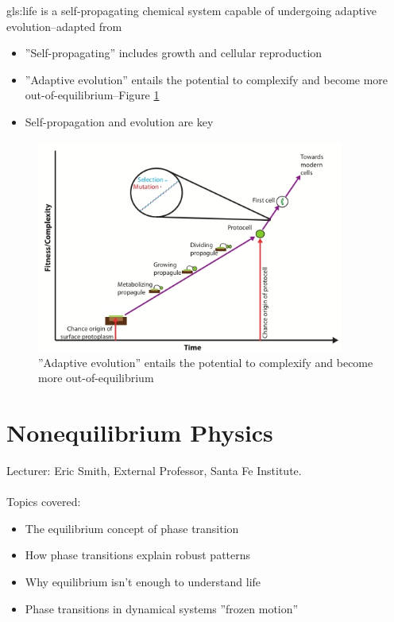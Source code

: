 \documentclass[]{article}
\begin{document}
\gls{gls:life} is a self-propagating chemical system capable of undergoing adaptive evolution--adapted from \cite{deamer1994origins}
\begin{itemize}
	\item ''Self-propagating'' includes growth and cellular reproduction 
	\item ''Adaptive evolution'' entails the potential to complexify and become more out-of-equilibrium--Figure \ref{fig:AdaptiveEvolution}
	\item Self-propagation and evolution are key
\end{itemize}

\begin{figure}[H]
	\caption{''Adaptive evolution'' entails the potential to complexify and become more out-of-equilibrium}\label{fig:AdaptiveEvolution} 
	\includegraphics[width=0.9\textwidth]{AdaptiveEvolution}
\end{figure}

\section{Nonequilibrium Physics}

Lecturer: Eric Smith, External Professor, Santa Fe Institute.\\
\\
Topics covered:
\begin{itemize}
	\item The equilibrium concept of phase transition
	
	\item How phase transitions explain robust patterns
	
	\item Why equilibrium isn’t enough to understand life
	\item Phase transitions in dynamical systems ''frozen motion''
\end{itemize}
\end{document}

